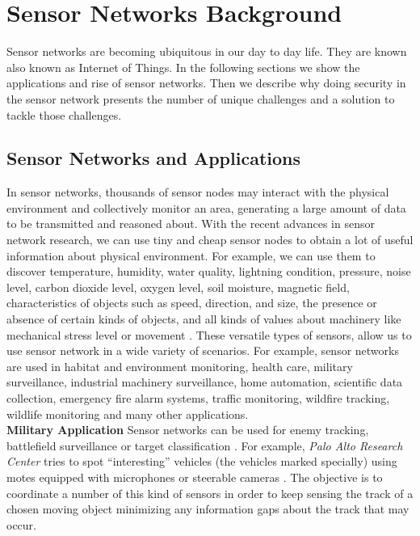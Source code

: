 \chapter{Sensor Networks Background} 
\label{cha:Sensor Networks/Data Aggregation/Security Background}
	Sensor networks are becoming ubiquitous in our day to day life. 
	They are known also known as Internet of Things.
	In the following sections we show the applications and rise of sensor networks.
	Then we describe why doing security in the sensor network presents the number of unique challenges and a solution to tackle those challenges.

\section{Sensor Networks and Applications}
	In sensor networks, thousands of sensor nodes may interact with the physical environment and collectively monitor an area, generating a large amount of data to be transmitted and reasoned about.
	With the recent advances in sensor network research, we can use tiny and cheap sensor nodes to obtain a lot of useful information about physical environment.
	For example, we can use them to discover temperature, humidity, water quality, lightning condition, pressure, noise level, carbon dioxide level, oxygen level, soil moisture, magnetic field, characteristics of objects such as speed, direction, and size, the presence or absence of certain kinds of objects, and all kinds of values about machinery like mechanical stress level or movement \cite{hof2007applications}.
	These versatile types of sensors, allow us to use sensor network in a wide variety of scenarios.
	For example, sensor networks are used in habitat and environment monitoring, health care, military surveillance, industrial machinery surveillance, home automation, scientific data collection, emergency fire alarm systems, traffic monitoring, wildfire tracking, wildlife monitoring and many other applications.\\
	\textbf{Military Application}
	Sensor networks can be used for enemy tracking, battlefield surveillance or target classification \cite{li2002detection}.
	For example, \textit{Palo Alto Research Center} tries to spot ``interesting'' vehicles (the vehicles marked specially) using motes equipped with microphones or steerable cameras \cite{chu2004distributed}.
	The objective is to coordinate a number of this kind of sensors in order to keep sensing the track of a chosen moving object minimizing any information gaps about the track that may occur.\\
